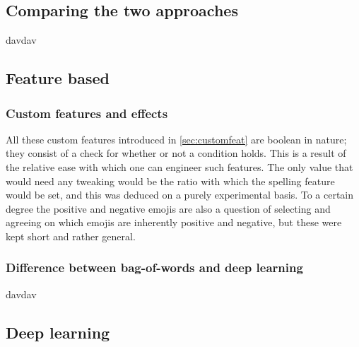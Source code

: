 \subsection{Comparing the two approaches}
davdav

\subsection{Feature based}
\subsubsection{Custom features and effects}
All these custom features introduced in \ref{sec:customfeat} are boolean in nature; they consist of a check for whether or not a condition holds. This is a result of the relative ease with which one can engineer such features. The only value that would need any tweaking would be the ratio with which the spelling feature would be set, and this was deduced on a purely experimental basis. To a certain degree the positive and negative emojis are also a question of selecting and agreeing on which emojis are inherently positive and negative, but these were kept short and rather general.

\subsubsection{Difference between bag-of-words and deep learning}
davdav

\subsection{Deep learning}
